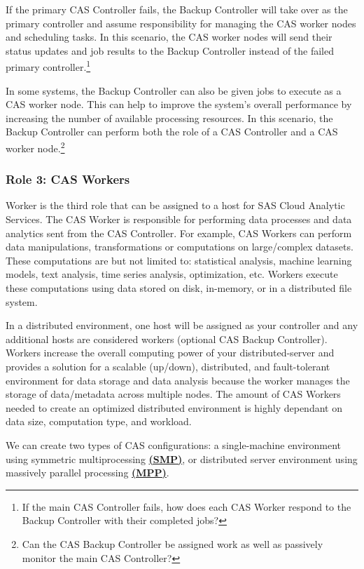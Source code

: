 If the primary CAS Controller fails, the Backup Controller will take over as the primary controller and assume responsibility for managing the CAS worker nodes and scheduling tasks. In this scenario, the CAS worker nodes will send their status updates and job results to the Backup Controller instead of the failed primary controller.\footnote{If the main CAS Controller fails, how does each CAS Worker respond to the Backup Controller with their completed jobs?}

In some systems, the Backup Controller can also be given jobs to execute as a CAS worker node. This can help to improve the system's overall performance by increasing the number of available processing resources. In this scenario, the Backup Controller can perform both the role of a CAS Controller and a CAS worker node.\footnote{Can the CAS Backup Controller be assigned work as well as passively monitor the main CAS Controller?}


\subsubsection{Role 3: CAS Workers}
Worker is the third role that can be assigned to a host for SAS Cloud Analytic Services. The CAS Worker is responsible for performing data processes and data analytics sent from the CAS Controller. For example, CAS Workers can perform data manipulations, transformations or computations on large/complex datasets. These computations are but not limited to: statistical analysis, machine learning models, text analysis, time series analysis, optimization, etc. Workers execute these computations using data stored on disk, in-memory, or in a distributed file system. 

In a distributed environment, one host will be assigned as your controller and any additional hosts are considered workers (optional CAS Backup Controller). Workers increase the overall computing power of your distributed-server and provides a solution for a scalable (up/down), distributed, and fault-tolerant environment for data storage and data analysis because the worker manages the storage of data/metadata across multiple nodes. The amount of CAS Workers needed to create an optimized distributed environment is highly dependant on data size, computation type, and workload.  

We can create two types of CAS configurations: a single-machine environment using symmetric multiprocessing \href{https://documentation.sas.com/doc/en/calcdc/3.3/calserverscas/n05000viyaservers000000admin.htm}{\textbf{(SMP)}}, or distributed server environment using massively parallel processing \href{https://documentation.sas.com/doc/en/calcdc/3.3/calserverscas/n05000viyaservers000000admin.htm}{\textbf{{(MPP)}}}.

